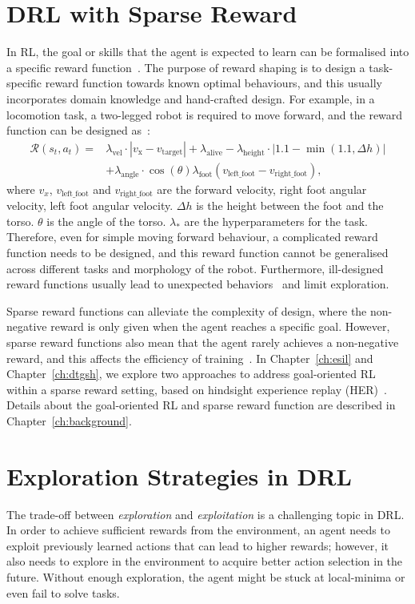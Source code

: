 \section{DRL with Sparse Reward}
In RL, the goal or skills that the agent is expected to learn can be formalised into a specific reward function~\cite{sutton2018reinforcement}. The purpose of reward shaping is to design a task-specific reward function towards known optimal behaviours, and this usually incorporates domain knowledge and hand-crafted design. For example, in a locomotion task, a two-legged robot is required to move forward, and the reward function can be designed as~\cite{lee2018composing}:
\begin{align}
\mathcal{R}(s_{t}, a_{t}) = & \lambda_{\text{vel}}\cdot |v_{\text{x}} - v_{\text{target}}| + \lambda_{\text{alive}} - \lambda_{\text{height}}\cdot |1.1 - \min (1.1, \Delta h)| \\
        & + \lambda_{\text{angle}}\cdot \cos (\theta) \lambda_{\text{foot}}(v_{\text{left\_foot}} - v_{\text{right\_foot}}), \nonumber
\label{eq:designed_reward_function}
\end{align}
where $v_{x}$, $v_{\text{left\_foot}}$ and $v_{\text{right\_foot}}$ are the forward velocity, right foot angular velocity, left foot angular velocity. $\Delta h$ is the height between the foot and the torso. $\theta$ is the angle of the torso. $\lambda_{*}$ are the hyperparameters for the task. Therefore, even for simple moving forward behaviour, a complicated reward function needs to be designed, and this reward function cannot be generalised across different tasks and morphology of the robot. Furthermore, ill-designed reward functions usually lead to unexpected behaviors~\cite{riedmiller2018learning} and limit exploration. 

Sparse reward functions can alleviate the complexity of design, where the non-negative reward is only given when the agent reaches a specific goal. However, sparse reward functions also mean that the agent rarely achieves a non-negative reward, and this affects the efficiency of training~\cite{andrychowicz2017hindsight}. In Chapter~\ref{ch:esil} and Chapter~\ref{ch:dtgsh}, we explore two approaches to address goal-oriented RL within a sparse reward setting, based on hindsight experience replay (HER)~\cite{andrychowicz2017hindsight}. Details about the goal-oriented RL and sparse reward function are described in Chapter~\ref{ch:background}.  

\section{Exploration Strategies in DRL}
The trade-off between \textit{exploration} and \textit{exploitation} is a challenging topic in DRL. In order to achieve sufficient rewards from the environment, an agent needs to exploit previously learned actions that can lead to higher rewards; however, it also needs to explore in the environment to acquire better action selection in the future. Without enough exploration, the agent might be stuck at local-minima or even fail to solve tasks.

